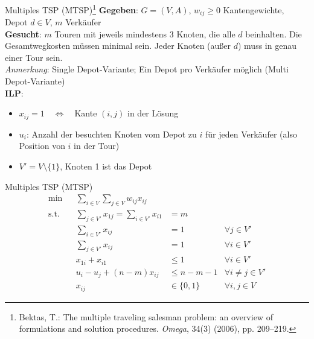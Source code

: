 \documentclass[ngerman,aspectratio=169,10pt]{beamer}
\begin{document}
\begin{frame}{Multiples TSP (MTSP)\footnote{Bektas, T.: The multiple traveling salesman problem: an overview of formulations and solution procedures. \emph{Omega}, 34(3) (2006), pp. 209–219.}}
	\textbf{Gegeben}: $G=(V,A)$, $w_{ij}\geq0$ Kantengewichte, Depot $d\in V$, $m$ Verkäufer\\
	\textbf{Gesucht}: $m$ Touren mit jeweils mindestens 3 Knoten, die alle $d$ beinhalten. Die Gesamtwegkosten müssen minimal sein. Jeder Knoten (außer $d$) muss in genau einer Tour sein.\\
	\emph{Anmerkung}: Single Depot-Variante; Ein Depot pro Verkäufer möglich (Multi Depot-Variante)\\

	\textbf{ILP}:
	\begin{itemize}
		\item $x_{ij}=1\quad\Leftrightarrow\quad$Kante $(i,j)$ in der Lösung
		\item $u_i$: Anzahl der besuchten Knoten vom Depot zu $i$ für jeden Verkäufer (also Position von $i$ in der Tour)
		\item $V'=V\setminus\{1\}$, Knoten 1 ist das Depot
	\end{itemize}
\end{frame}
\begin{frame}{Multiples TSP (MTSP)}
	\begin{align*}
	\min && \sum_{i\in V}\sum_{j\in V}w_{ij}x_{ij}&&\\
	\text{s.t.} && \sum_{j\in V'}x_{1j}=\sum_{i\in V'}x_{i1}&=m&\\
	&& \sum_{i\in V'}x_{ij} &=1 &\forall j\in V'\\
	&& \sum_{j\in V'}x_{ij} &=1 &\forall i\in V'\\
	&& x_{1i}+x_{i1} &\leq1 &\forall i\in V'\\
	&& u_i-u_j+(n-m)x_{ij} &\leq n-m-1 &\forall i\neq j\in V'\\
	&& x_{ij} &\in\{0,1\} &\forall i,j\in V
	\end{align*}
\end{frame}
\end{document}
